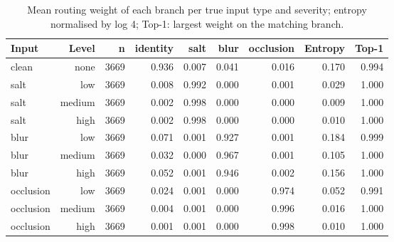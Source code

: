 \begin{table}[t]
\centering
\caption{Mean routing weight of each branch per true input type and severity; entropy normalised by log 4; Top-1: largest weight on the matching branch.}
\label{tab:task3_routing_by_type_level}
\begin{tabular}{lrrrrrrrr}
\toprule
Input & Level & n & identity & salt & blur & occlusion & Entropy & Top-1 \\
\midrule
clean & none & 3669 & 0.936 & 0.007 & 0.041 & 0.016 & 0.170 & 0.994 \\
salt & low & 3669 & 0.008 & 0.992 & 0.000 & 0.001 & 0.029 & 1.000 \\
salt & medium & 3669 & 0.002 & 0.998 & 0.000 & 0.000 & 0.009 & 1.000 \\
salt & high & 3669 & 0.002 & 0.998 & 0.000 & 0.000 & 0.010 & 1.000 \\
blur & low & 3669 & 0.071 & 0.001 & 0.927 & 0.001 & 0.184 & 0.999 \\
blur & medium & 3669 & 0.032 & 0.000 & 0.967 & 0.001 & 0.105 & 1.000 \\
blur & high & 3669 & 0.052 & 0.001 & 0.946 & 0.002 & 0.156 & 1.000 \\
occlusion & low & 3669 & 0.024 & 0.001 & 0.000 & 0.974 & 0.052 & 0.991 \\
occlusion & medium & 3669 & 0.004 & 0.001 & 0.000 & 0.996 & 0.016 & 1.000 \\
occlusion & high & 3669 & 0.001 & 0.001 & 0.000 & 0.998 & 0.010 & 1.000 \\
\bottomrule
\end{tabular}
\end{table}
